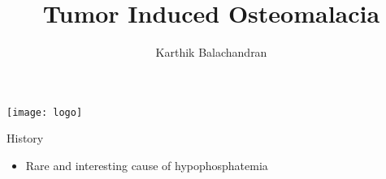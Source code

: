 \documentclass[english]{beamer} %
\begin{document}
\title[TIO]{Tumor Induced Osteomalacia}

\author{Karthik Balachandran}
\date{}

\begin{frame}
  \titlepage
  \vspace{-30pt}
  \begin{center}
    \texttt{[image: logo]}
  \end{center}
\end{frame}



\begin{frame}[<+->]{History}
\begin{itemize}
\item Rare and interesting cause of hypophosphatemia
\end{itemize}
\end{frame}
\end{document}
